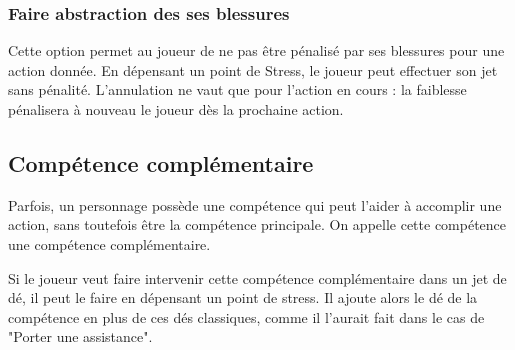 \subsubsection{Faire abstraction des ses blessures}

Cette option permet au joueur de ne pas être pénalisé par ses blessures pour une action donnée. En dépensant un point de Stress, le joueur peut effectuer son jet sans pénalité. L'annulation ne vaut que pour l'action en cours : la faiblesse pénalisera à nouveau le joueur dès la prochaine action.

\subsection{Compétence complémentaire}

Parfois, un personnage possède une compétence qui peut l'aider à accomplir une action, sans toutefois être la compétence principale. On appelle cette compétence une compétence complémentaire. 

Si le joueur veut faire intervenir cette compétence complémentaire dans un jet de dé, il peut le faire en dépensant un point de stress. Il ajoute alors le dé de la compétence en plus de ces dés classiques, comme il l'aurait fait dans le cas de "Porter une assistance".